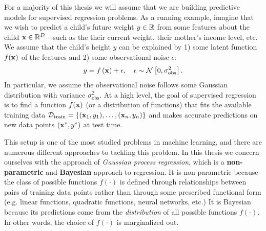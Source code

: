 For a majority of this thesis we will assume that we are building predictive models for supervised regression problems.
As a running example, imagine that we wish to predict a child's future weight $y \in \mathbb{R}$ from some features about the child $\mathbf{x} \in \mathbb{R}^{D}$---such as the their current weight, their mother's income level, etc.
We assume that the child's height $y$ can be explained by 1) some latent function $f(\mathbf{x})$ of the features and 2) some observational noise $\epsilon$:
%
\begin{equation}
  y = f \left( \mathbf{x} \right) + \epsilon, \quad \epsilon \sim \mathcal{N} \left[ 0, \sigma_\text{obs}^2 \right].
  \label{eqn:regression}
\end{equation}
%
In particular, we assume the observational noise follows some Gaussian distribution with variance $\sigma_\text{obs}^2$.
At a high level, the goal of supervised regression is to find a function $f(\mathbf{x})$ (or a distribution of functions) that fits the available training data $\mathcal D_\text{train} = \{(\mathbf{x}_1, y_1), \ldots, (\mathbf{x}_n, y_n)\}$ and makes accurate predictions on new data points $( \mathbf{x}^*, y^* )$ at test time.

This setup is one of the most studied problems in machine learning, and there are numerous different approaches to tackling this problem.
In this thesis we concern ourselves with the approach of \emph{Gaussian process regression}, which is a {\bf non-parametric} and {\bf Bayesian} approach to regression.
It is non-parametric because the class of possible functions $f(\cdot)$ is defined through relationships between pairs of training data points
rather than through some prescribed functional form (e.g. linear functions, quadratic functions, neural networks, etc.)
It is Bayesian because its predictions come from the \emph{distribution} of all possible functions $f(\cdot)$.
In other words, the choice of $f(\cdot)$ is marginalized out.
